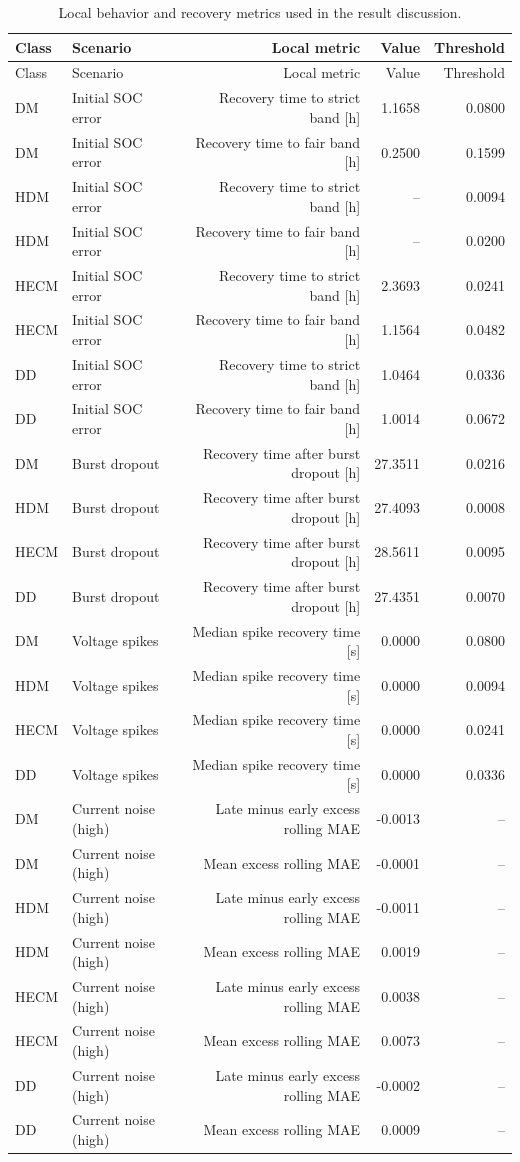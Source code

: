 \documentclass[review]{elsarticle}
\begin{document}
\begin{longtable}{llrrr}
\caption{Local behavior and recovery metrics used in the result discussion.}\label{tab:appendix_local_metrics}\\
\toprule
Class & Scenario & Local metric & Value & Threshold \\
\midrule
\endfirsthead
\toprule
Class & Scenario & Local metric & Value & Threshold \\
\midrule
\endhead
DM & Initial SOC error & Recovery time to strict band [h] & 1.1658 & 0.0800 \\
DM & Initial SOC error & Recovery time to fair band [h] & 0.2500 & 0.1599 \\
HDM & Initial SOC error & Recovery time to strict band [h] & -- & 0.0094 \\
HDM & Initial SOC error & Recovery time to fair band [h] & -- & 0.0200 \\
HECM & Initial SOC error & Recovery time to strict band [h] & 2.3693 & 0.0241 \\
HECM & Initial SOC error & Recovery time to fair band [h] & 1.1564 & 0.0482 \\
DD & Initial SOC error & Recovery time to strict band [h] & 1.0464 & 0.0336 \\
DD & Initial SOC error & Recovery time to fair band [h] & 1.0014 & 0.0672 \\
DM & Burst dropout & Recovery time after burst dropout [h] & 27.3511 & 0.0216 \\
HDM & Burst dropout & Recovery time after burst dropout [h] & 27.4093 & 0.0008 \\
HECM & Burst dropout & Recovery time after burst dropout [h] & 28.5611 & 0.0095 \\
DD & Burst dropout & Recovery time after burst dropout [h] & 27.4351 & 0.0070 \\
DM & Voltage spikes & Median spike recovery time [s] & 0.0000 & 0.0800 \\
HDM & Voltage spikes & Median spike recovery time [s] & 0.0000 & 0.0094 \\
HECM & Voltage spikes & Median spike recovery time [s] & 0.0000 & 0.0241 \\
DD & Voltage spikes & Median spike recovery time [s] & 0.0000 & 0.0336 \\
DM & Current noise (high) & Late minus early excess rolling MAE & -0.0013 & -- \\
DM & Current noise (high) & Mean excess rolling MAE & -0.0001 & -- \\
HDM & Current noise (high) & Late minus early excess rolling MAE & -0.0011 & -- \\
HDM & Current noise (high) & Mean excess rolling MAE & 0.0019 & -- \\
HECM & Current noise (high) & Late minus early excess rolling MAE & 0.0038 & -- \\
HECM & Current noise (high) & Mean excess rolling MAE & 0.0073 & -- \\
DD & Current noise (high) & Late minus early excess rolling MAE & -0.0002 & -- \\
DD & Current noise (high) & Mean excess rolling MAE & 0.0009 & -- \\
\bottomrule
\end{longtable}
\end{document}
